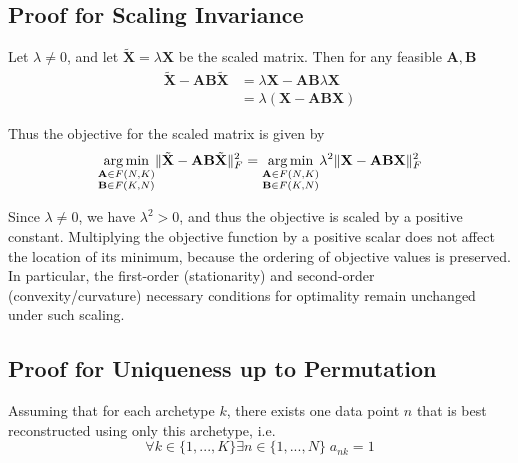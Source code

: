 \documentclass[oneside]{article}
\DeclareMathOperator*{\argmin}{arg\,min}
\begin{document}
\subsection{Proof for Scaling Invariance}
\label{subsec:scaling_invariance}

Let $\lambda \neq 0$, and let $\tilde{\mathbf{X}} = \lambda \mathbf{X}$ be the scaled matrix. Then for any feasible $\mathbf{A}, \mathbf{B}$
\begin{equation}
    \begin{aligned}
    \tilde{\mathbf{X}} - \mathbf{A} \mathbf{B} \tilde{\mathbf{X}}
    &= \lambda \mathbf{X} - \mathbf{A} \mathbf{B} \lambda \mathbf{X} \\
    &= \lambda \left( \mathbf{X} - \mathbf{A} \mathbf{B} \mathbf{X} \right)
    \end{aligned}
\end{equation}

Thus the objective for the scaled matrix is given by
\begin{equation}
    \underset{\begin{subarray}{c} \mathbf{A} \in F(N, K) \\ \mathbf{B} \in F(K, N) \end{subarray}}{\argmin} \| \tilde{\mathbf{X}} - \mathbf{A} \mathbf{B} \tilde{\mathbf{X}} \|_F^2 = \underset{\begin{subarray}{c} \mathbf{A} \in F(N, K) \\ \mathbf{B} \in F(K, N) \end{subarray}}{\argmin} \lambda^2 \| \mathbf{X} - \mathbf{A} \mathbf{B} \mathbf{X} \|_F^2
\end{equation}

Since $\lambda \neq 0$, we have $\lambda^2 > 0$, and thus the objective is scaled by a positive constant. Multiplying the objective function by a positive scalar does not affect the location of its minimum, because the ordering of objective values is preserved. In particular, the first-order (stationarity) and second-order (convexity/curvature) necessary conditions for optimality remain unchanged under such scaling.

\subsection{Proof for Uniqueness up to Permutation}
\label{subsec:uniqueness}

Assuming that for each archetype $k$, there exists one data point $n$ that is best reconstructed using only this archetype, i.e.
\begin{equation}
    \label{eq:cond1_}
    \forall k \in \{1, ..., K\} \exists n \in \{1, ..., N\} \; a_{n k} = 1
\end{equation}
\end{document}
